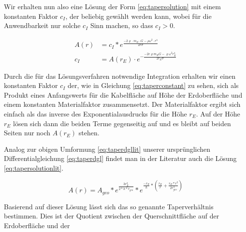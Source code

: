 \documentclass[a4paper, 10pt]{report}
\begin{document}
Wir erhalten nun also eine Lösung der Form \ref{eq:tapersolution} mit einem konstanten Faktor $c_I$, der beliebig gewählt werden kann, wobei für die Anwendbarkeit nur solche $c_I$ Sinn machen, so dass $c_I>0$.

\begin{align}
A(r) &= c_I * e^{\frac{-2\varrho \cdot m_E \cdot G - \rho \omega^2 \cdot r^3}{2 r \sigma}}\label{eq:tapersolution}\\
c_I &= A(r_E) \cdot e^{-\frac{-2 c \varrho m_E G - \varrho \omega^2 r_E^3}{2 r_E \sigma}}
\label{eq:taperconstant}
\end{align}

Durch die für das Lösungsverfahren notwendige Integration erhalten wir einen konstanten Faktor $c_I$ der, wie in Gleichung \ref{eq:taperconstant} zu sehen, sich als Produkt eines Anfangswerts für die Kabelfläche auf Höhe der Erdoberfläche und einem konstanten Materialfaktor zusammensetzt. Der Materialfaktor ergibt sich einfach als das inverse des Exponentialausdrucks für die Höhe $r_E$. Auf der Höhe $r_E$ lösen sich dann die beiden Terme gegenseitig auf und es bleibt auf beiden Seiten nur noch $A(r_E)$ stehen.

Analog zur obigen Umformung \ref{eq:taperdgllit} unserer ursprünglichen Differentialgleichung \ref{eq:taperdgl} findet man in der Literatur\cite{PE75} auch die Lösung \ref{eq:tapersolutionlit}.

\begin{equation}
A(r)=A_{geo}*e^\frac{3r_E^2}{2*h*r_{geo}}*e^{\frac{-r_E}{h}*(\frac{r_E}{r}+\frac{r_E*r^2}{2r_{geo}^3})}
\label{eq:tapersolutionlit}
\end{equation}

Basierend auf dieser Lösung lässt sich das so genannte Taperverhältnis bestimmen. Dies ist der Quotient zwischen der Querschnittfläche auf der Erdoberfläche und der 
\end{document}
